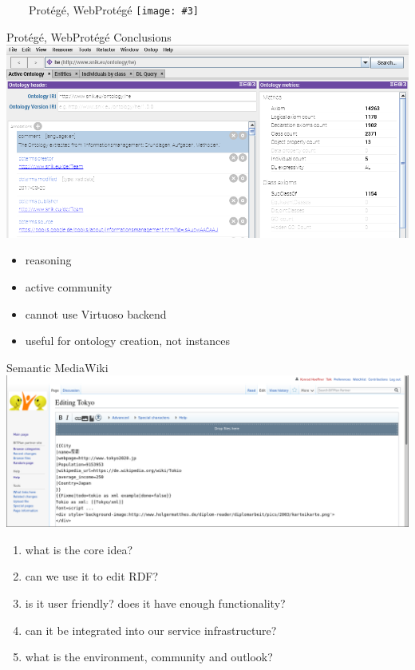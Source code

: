\documentclass[aspectratio=1610]{beamer}
\newcommand{\imageslide}[4][]
{
\begin{frame}[plain]{~~~~#2}
\vspace{0.2em}
\centering\texttt{[image: \#3]}
\\#1
\note{#4}
\end{frame}
}
\begin{document}
\imageslide{Prot\'eg\'e, WebProt\'eg\'e}{img/protege.png}{}{}

\begin{frame}{Prot\'eg\'e, WebProt\'eg\'e Conclusions}
\centering
\includegraphics[width=0.4\paperwidth]{img/protege.png}
\begin{itemize}
\item reasoning
\item active community
\item cannot use Virtuoso backend
\item useful for ontology creation, not instances
\end{itemize}
\end{frame}

\begin{frame}{Semantic MediaWiki}
\centering
\includegraphics[width=0.6\paperwidth]{img/smw-tokyo.png}
\begin{enumerate}
\item what is the core idea?
\item can we use it to edit RDF?
\item is it user friendly? does it have enough functionality?
\item can it be integrated into our service infrastructure?
\item what is the environment, community and outlook?
\end{enumerate}
\end{frame}
\end{document}
